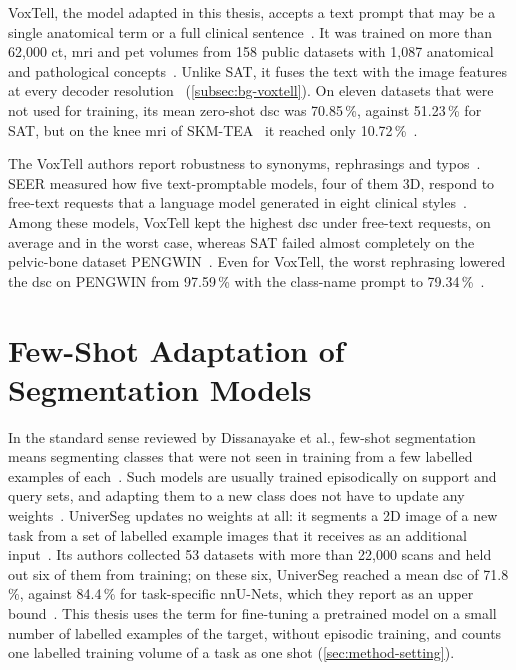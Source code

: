 VoxTell, the model adapted in this thesis, accepts a text prompt that may be a single anatomical term or a full clinical sentence~\cite{rokuss2025voxtellfreetextpromptableuniversal}.
It was trained on more than 62{,}000 \gls{ct}, \gls{mri} and \gls{pet} volumes from 158 public datasets with 1{,}087 anatomical and pathological concepts~\cite[p.~4]{rokuss2025voxtellfreetextpromptableuniversal}.
Unlike SAT, it fuses the text with the image features at every decoder resolution~\cite[p.~4]{rokuss2025voxtellfreetextpromptableuniversal} (\cref{subsec:bg-voxtell}).
On eleven datasets that were not used for training, its mean zero-shot \gls{dsc} was 70.85\,\%, against 51.23\,\% for SAT, but on the knee \gls{mri} of SKM-TEA~\cite{desai2021skmtea} it reached only 10.72\,\%~\cite{rokuss2025voxtellfreetextpromptableuniversal}.

The VoxTell authors report robustness to synonyms, rephrasings and typos~\cite{rokuss2025voxtellfreetextpromptableuniversal}.
SEER measured how five text-promptable models, four of them 3D, respond to free-text requests that a language model generated in eight clinical styles~\cite{zhang2026seer}.
Among these models, VoxTell kept the highest \gls{dsc} under free-text requests, on average and in the worst case, whereas SAT failed almost completely on the pelvic-bone dataset PENGWIN~\cite{zhang2026seer}.
Even for VoxTell, the worst rephrasing lowered the \gls{dsc} on PENGWIN from 97.59\,\% with the class-name prompt to 79.34\,\%~\cite{zhang2026seer}.
\section{Few-Shot Adaptation of Segmentation Models}
\label{sec:sota-few-shot}

In the standard sense reviewed by Dissanayake et al., few-shot segmentation means segmenting classes that were not seen in training from a few labelled examples of each~\cite[Sec.~2.2.1]{theekshana26fewshot}.
Such models are usually trained episodically on support and query sets, and adapting them to a new class does not have to update any weights~\cite[Sec.~2.2]{theekshana26fewshot}.
UniverSeg updates no weights at all: it segments a 2D image of a new task from a set of labelled example images that it receives as an additional input~\cite{universeg}.
Its authors collected 53 datasets with more than 22{,}000 scans and held out six of them from training; on these six, UniverSeg reached a mean \gls{dsc} of 71.8\,\%, against 84.4\,\% for task-specific nnU-Nets, which they report as an upper bound~\cite{universeg}.
This thesis uses the term for fine-tuning a pretrained model on a small number of labelled examples of the target, without episodic training, and counts one labelled training volume of a task as one shot (\cref{sec:method-setting}).

